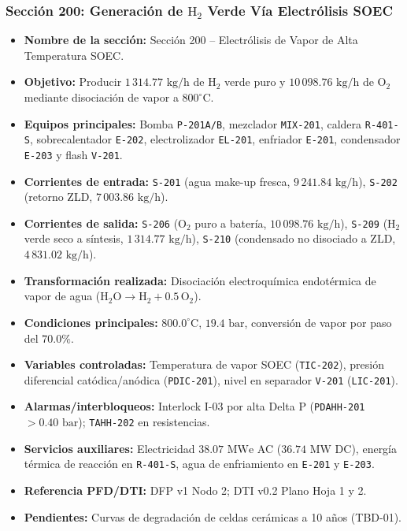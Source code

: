 \documentclass[10pt,letterpaper]{article}
\begin{document}
\subsubsection{Sección 200: Generación de \texorpdfstring{$\text{H}_2$}{H2} Verde Vía Electrólisis SOEC}
\begin{itemize}
    \item \textbf{Nombre de la sección:} Sección 200 -- Electrólisis de Vapor de Alta Temperatura SOEC.
    \item \textbf{Objetivo:} Producir $1\,314.77\text{ kg/h}$ de $\text{H}_2$ verde puro y $10\,098.76\text{ kg/h}$ de $\text{O}_2$ mediante disociación de vapor a $800^\circ\text{C}$.
    \item \textbf{Equipos principales:} Bomba \texttt{P-201A/B}, mezclador \texttt{MIX-201}, caldera \texttt{R-401-S}, sobrecalentador \texttt{E-202}, electrolizador \texttt{EL-201}, enfriador \texttt{E-201}, condensador \texttt{E-203} y flash \texttt{V-201}.
    \item \textbf{Corrientes de entrada:} \texttt{S-201} (agua make-up fresca, $9\,241.84\text{ kg/h}$), \texttt{S-202} (retorno ZLD, $7\,003.86\text{ kg/h}$).
    \item \textbf{Corrientes de salida:} \texttt{S-206} ($\text{O}_2$ puro a batería, $10\,098.76\text{ kg/h}$), \texttt{S-209} ($\text{H}_2$ verde seco a síntesis, $1\,314.77\text{ kg/h}$), \texttt{S-210} (condensado no disociado a ZLD, $4\,831.02\text{ kg/h}$).
    \item \textbf{Transformación realizada:} Disociación electroquímica endotérmica de vapor de agua ($\text{H}_2\text{O} \to \text{H}_2 + 0.5\,\text{O}_2$).
    \item \textbf{Condiciones principales:} $800.0^\circ\text{C}$, $19.4\text{ bar}$, conversión de vapor por paso del $70.0\%$.
    \item \textbf{Variables controladas:} Temperatura de vapor SOEC (\texttt{TIC-202}), presión diferencial catódica/anódica (\texttt{PDIC-201}), nivel en separador \texttt{V-201} (\texttt{LIC-201}).
    \item \textbf{Alarmas/interbloqueos:} Interlock I-03 por alta Delta P (\texttt{PDAHH-201} $>0.40\text{ bar}$); \texttt{TAHH-202} en resistencias.
    \item \textbf{Servicios auxiliares:} Electricidad $38.07\text{ MWe}$ AC ($36.74\text{ MW}$ DC), energía térmica de reacción en \texttt{R-401-S}, agua de enfriamiento en \texttt{E-201} y \texttt{E-203}.
    \item \textbf{Referencia PFD/DTI:} DFP v1 Nodo 2; DTI v0.2 Plano Hoja 1 y 2.
    \item \textbf{Pendientes:} Curvas de degradación de celdas cerámicas a 10 años (TBD-01).
\end{itemize}
\end{document}
